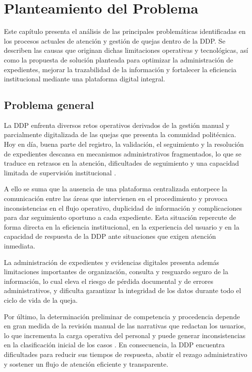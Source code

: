 	\section{Planteamiento del Problema}
	Este capítulo presenta el análisis de las principales problemáticas identificadas en los procesos
	actuales de atención y gestión de quejas dentro de la DDP. Se describen las causas que originan
	dichas limitaciones operativas y tecnológicas, así como la propuesta de solución planteada para
	optimizar la administración de expedientes, mejorar la trazabilidad de la información y fortalecer
	la eficiencia institucional mediante una plataforma digital integral.
	
	\subsection{Problema general}
	La DDP enfrenta diversos retos operativos derivados de la gestión manual y parcialmente digitalizada
	de las quejas que presenta la comunidad politécnica. Hoy en día, buena parte del registro, la
	validación, el seguimiento y la resolución de expedientes descansa en mecanismos administrativos
	fragmentados, lo que se traduce en retrasos en la atención, dificultades de seguimiento y una
	capacidad limitada de supervisión institucional \cite{ipn_manual_procedimientos_ddp}.
	
	A ello se suma que la ausencia de una plataforma centralizada entorpece la comunicación entre las
	áreas que intervienen en el procedimiento y provoca inconsistencias en el flujo operativo, duplicidad
	de información y complicaciones para dar seguimiento oportuno a cada expediente. Esta situación
	repercute de forma directa en la eficiencia institucional, en la experiencia del usuario y en la
	capacidad de respuesta de la DDP ante situaciones que exigen atención inmediata.
	
	La administración de expedientes y evidencias digitales presenta además limitaciones importantes de
	organización, consulta y resguardo seguro de la información, lo cual eleva el riesgo de pérdida
	documental y de errores administrativos, y dificulta garantizar la integridad de los datos durante
	todo el ciclo de vida de la queja.
	
	Por último, la determinación preliminar de competencia y procedencia depende en gran medida de la
	revisión manual de las narrativas que redactan los usuarios, lo que incrementa la carga operativa del
	personal y puede generar inconsistencias en la clasificación inicial de los casos
	\cite{ipn_acuerdo622}. En consecuencia, la DDP encuentra dificultades para reducir sus tiempos de
	respuesta, abatir el rezago administrativo y sostener un flujo de atención eficiente y transparente.
	
